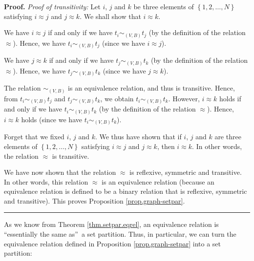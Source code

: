 \documentclass[numbers=enddot,12pt,final,onecolumn,notitlepage]{scrartcl}%
\theoremstyle{definition}
\newenvironment{proof}[1][Proof]{\noindent\textbf{#1.} }{\ \rule{0.5em}{0.5em}}
\newenvironment{verlong}{}{}
\begin{document}
\begin{verlong}
\begin{proof}
\textit{Proof of transitivity:} Let $i$, $j$ and $k$ be three elements of
$\left\{  1,2,\ldots,N\right\}  $ satisfying $i\approx j$ and $j\approx k$. We
shall show that $i\approx k$.

We have $i\approx j$ if and only if we have $t_{i}\sim_{\left(  V,B\right)
}t_{j}$ (by the definition of the relation $\approx$). Hence, we have
$t_{i}\sim_{\left(  V,B\right)  }t_{j}$ (since we have $i\approx j$).

We have $j\approx k$ if and only if we have $t_{j}\sim_{\left(  V,B\right)
}t_{k}$ (by the definition of the relation $\approx$). Hence, we have
$t_{j}\sim_{\left(  V,B\right)  }t_{k}$ (since we have $j\approx k$).

The relation $\sim_{\left(  V,B\right)  }$ is an equivalence relation, and
thus is transitive. Hence, from $t_{i}\sim_{\left(  V,B\right)  }t_{j}$ and
$t_{j}\sim_{\left(  V,B\right)  }t_{k}$, we obtain $t_{i}\sim_{\left(
V,B\right)  }t_{k}$. However, $i\approx k$ holds if and only if we have
$t_{i}\sim_{\left(  V,B\right)  }t_{k}$ (by the definition of the relation
$\approx$). Hence, $i\approx k$ holds (since we have $t_{i}\sim_{\left(
V,B\right)  }t_{k}$).

Forget that we fixed $i$, $j$ and $k$. We thus have shown that if $i$, $j$ and
$k$ are three elements of $\left\{  1,2,\ldots,N\right\}  $ satisfying
$i\approx j$ and $j\approx k$, then $i\approx k$. In other words, the relation
$\approx$ is transitive.

We have now shown that the relation $\approx$ is reflexive, symmetric and
transitive. In other words, this relation $\approx$ is an equivalence relation
(because an equivalence relation is defined to be a binary relation that is
reflexive, symmetric and transitive). This proves Proposition
\ref{prop.graph-setpar}.
\end{proof}
\end{verlong}

As we know from Theorem \ref{thm.setpar.eqrel}, an equivalence relation is
\textquotedblleft essentially the same as\textquotedblright\ a set partition.
Thus, in particular, we can turn the equivalence relation defined in
Proposition \ref{prop.graph-setpar} into a set partition:
\end{document}
